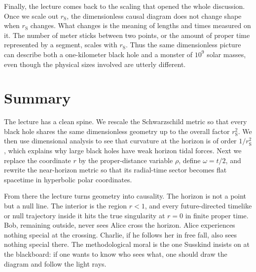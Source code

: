 Finally, the lecture comes back to the scaling that opened the whole discussion. Once we scale out \(r_{\mathrm S}\), the dimensionless causal diagram does not change shape when \(r_{\mathrm S}\) changes. What changes is the meaning of lengths and times measured on it. The number of meter sticks between two points, or the amount of proper time represented by a segment, scales with \(r_{\mathrm S}\). Thus the same dimensionless picture can describe both a one-kilometer black hole and a monster of \(10^9\) solar masses, even though the physical sizes involved are utterly different.

\section{Summary}

The lecture has a clean spine. We rescale the Schwarzschild metric so that every black hole shares the same dimensionless geometry up to the overall factor \(r_{\mathrm S}^2\). We then use dimensional analysis to see that curvature at the horizon is of order \(1/r_{\mathrm S}^2\), which explains why large black holes have weak horizon tidal forces. Next we replace the coordinate \(r\) by the proper-distance variable \(\rho\), define \(\omega=t/2\), and rewrite the near-horizon metric so that its radial-time sector becomes flat spacetime in hyperbolic polar coordinates.

From there the lecture turns geometry into causality. The horizon is not a point but a null line. The interior is the region \(r<1\), and every future-directed timelike or null trajectory inside it hits the true singularity at \(r=0\) in finite proper time. Bob, remaining outside, never sees Alice cross the horizon. Alice experiences nothing special at the crossing. Charlie, if he follows her in free fall, also sees nothing special there. The methodological moral is the one Susskind insists on at the blackboard: if one wants to know who sees what, one should draw the diagram and follow the light rays.